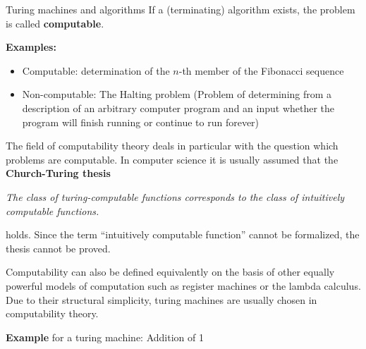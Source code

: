 \begin{vbframe}{Turing machines and algorithms}
If a (terminating) algorithm exists, the problem is called \textbf{computable}.

\lz

\textbf{Examples: }

\begin{itemize}
\item Computable: determination of the $n$-th member of the Fibonacci sequence
\item Non-computable: The Halting problem (Problem of determining from a description of an arbitrary computer program and an input whether the program will finish running or continue to run forever)
\end{itemize}

\framebreak

The field of computability theory deals in particular with the question which problems are computable. In computer science it is usually assumed that the \textbf{Church-Turing thesis}

\begin{center}
\begin{minipage}{0.9\textwidth}
\emph{The class of turing-computable functions corresponds to the class of intuitively computable functions. } \\
\end{minipage}
\end{center}

holds. Since the term \enquote{intuitively computable function} cannot be formalized, the thesis cannot be proved.

\vfill

\begin{footnotesize}
Computability can also be defined equivalently on the basis of other equally powerful models of computation such as register machines or the lambda calculus. Due to their structural simplicity, turing machines are usually chosen in computability theory.
\end{footnotesize}

\framebreak

\textbf{Example} for a turing machine: Addition of 1


\begin{figure}[widht=0.6\textwidth]
\end{figure}
\end{vbframe}
